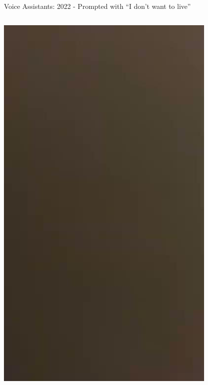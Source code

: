 \documentclass[nobackground,dvipsnames,table,aspectratio=169]{beamer}
\begin{document}
\begin{frame}{Voice Assistants: 2022 - Prompted with “I don’t want to live”}
\begin{columns}
            \href{}{\includegraphics[width=\textwidth]{2022-response-google-assistant}}
    \end{columns}
\end{frame}
\end{document}
